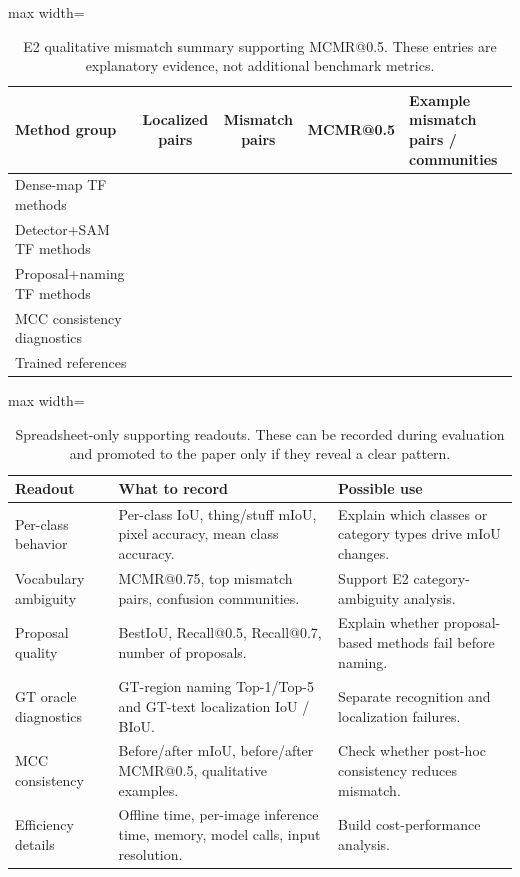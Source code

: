 \documentclass[11pt,a4paper]{article}
\begin{document}
\begin{table}[H]
\centering
\scriptsize
\caption{E2 qualitative mismatch summary supporting MCMR@0.5. These entries are explanatory evidence, not additional benchmark metrics.}
\label{tab:appendix-ambiguity-graph}
\begin{adjustbox}{max width=\textwidth}
\begin{tabular}{l c c c p{}}
\toprule
Method group & Localized pairs & Mismatch pairs & MCMR@0.5 & Example mismatch pairs / communities \\
\midrule
Dense-map TF methods & & & & \\
Detector+SAM TF methods & & & & \\
Proposal+naming TF methods & & & & \\
MCC consistency diagnostics & & & & \\
Trained references & & & & \\
\bottomrule
\end{tabular}
\end{adjustbox}
\end{table}

\begin{table}[H]
\centering
\scriptsize
\caption{Spreadsheet-only supporting readouts. These can be recorded during evaluation and promoted to the paper only if they reveal a clear pattern.}
\label{tab:appendix-supporting-readouts}
\begin{adjustbox}{max width=\textwidth}
\begin{tabular}{p{} p{} p{}}
\toprule
Readout & What to record & Possible use \\
\midrule
Per-class behavior & Per-class IoU, thing/stuff mIoU, pixel accuracy, mean class accuracy. & Explain which classes or category types drive mIoU changes. \\
Vocabulary ambiguity & MCMR@0.75, top mismatch pairs, confusion communities. & Support E2 category-ambiguity analysis. \\
Proposal quality & BestIoU, Recall@0.5, Recall@0.7, number of proposals. & Explain whether proposal-based methods fail before naming. \\
GT oracle diagnostics & GT-region naming Top-1/Top-5 and GT-text localization IoU / BIoU. & Separate recognition and localization failures. \\
MCC consistency & Before/after mIoU, before/after MCMR@0.5, qualitative examples. & Check whether post-hoc consistency reduces mismatch. \\
Efficiency details & Offline time, per-image inference time, memory, model calls, input resolution. & Build cost-performance analysis. \\
\bottomrule
\end{tabular}
\end{adjustbox}
\end{table}
\end{document}
